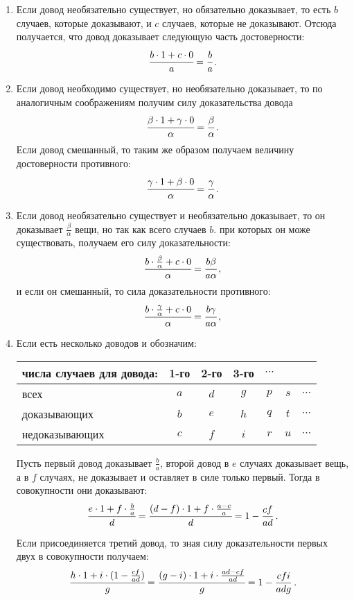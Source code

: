 \documentclass[12pt]{article}
\begin{document}
\begin{enumerate}
\item Если довод необязательно существует, но обязательно доказывает, то есть $b$ случаев, которые доказывают, и $c$ случаев, которые не доказывают. Отсюда получается, что довод доказывает следующую часть достоверности: $$\cfrac{b \cdot 1 + c \cdot 0}{a} = \cfrac{b}{a} \, .$$

\item Если довод необходимо существует, но необязательно доказывает, то по аналогичным соображениям получим силу доказательства довода $$\cfrac{\beta \cdot 1 + \gamma \cdot 0}{\alpha} = \cfrac{\beta}{\alpha} \, .$$
Если довод смешанный, то таким же образом получаем величину достоверности противного: $$\cfrac{\gamma \cdot 1 + \beta \cdot 0}{\alpha} = \cfrac{\gamma}{\alpha} \, .$$

\item Если довод необязательно существует и необязательно доказывает, то он доказывает $\frac{\beta}{\alpha}$ вещи, но так как всего случаев $b$. при которых он може существовать, получаем его силу доказательности: $$\cfrac{b \cdot \frac{\beta}{\alpha} + c \cdot 0}{\alpha} = \cfrac{b \beta}{a \alpha}  \, ,$$
и если он смешанный, то сила доказательности противного:$$\cfrac{b \cdot \frac{\gamma}{\alpha} + c \cdot 0}{\alpha} = \cfrac{b \gamma}{a \alpha} \, ,$$

\item Если есть несколько доводов и обозначим:

\hspace{5pt}
\begin{tabular}{l|cccccc}
числа случаев для довода: & 1-го & 2-го & 3-го & $\cdots$  \\
\hline
всех & $a$ & $d$ & $g$ & $p$ & $s$ & $\cdots$ \\
доказывающих & $b$ & $e$ & $h$ & $q$ & $t$ &$\cdots$ \\
недоказывающих & $c$ & $f$ & $i$ & $r$ & $u$ & $\cdots$ \\
\end{tabular}

\hspace{5pt}
Пусть первый довод доказывает $\frac{b}{a}$, второй довод в $e$ случаях доказывает вещь, а в $f$ случаях, не доказывает и оставляет в силе только первый. Тогда в совокупности они доказывают:
$$\cfrac{e \cdot 1 + f \cdot \frac{b}{a}}{d} = \cfrac{(d - f) \cdot 1 +f \cdot \frac{a - c}{a}}{d} = 1 - \frac{cf}{ad} \, .$$

Если присоединяется третий довод, то зная силу доказательности первых двух в совокупности получаем:
$$\cfrac{h \cdot 1 + i \cdot (1 - \frac{cf}{ad})}{g} = \cfrac{(g - i) \cdot 1 + i \cdot \frac{ad - cf}{ad}}{g} = 1 - \frac{cfi}{adg} \, .$$


\end{enumerate}
\end{document}
